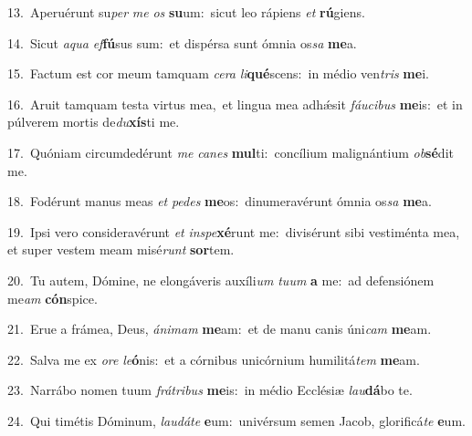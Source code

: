 {\numbfont\textcolor{\numbcolor}{13.}}~Aperuérunt su\textit{per} \textit{me} \textit{os} \textbf{su}\-um:~\star sicut leo rápiens \textit{et} \textbf{rú}\-giens.\par
{\numbfont\textcolor{\numbcolor}{14.}}~Sicut \textit{a}\-\textit{qua} \textit{ef}\-\textbf{fú}sus sum:~\star et dispérsa sunt ómnia os\textit{sa} \textbf{me}\-a.\par
{\numbfont\textcolor{\numbcolor}{15.}}~Factum est cor meum tamquam \textit{ce}\-\textit{ra} \textit{li}\-\textbf{qué}scens:~\star in médio ven\textit{tris} \textbf{me}\-i.\par
{\numbfont\textcolor{\numbcolor}{16.}}~Aruit tamquam testa virtus mea,~\dagger et lingua mea adhǽsit \textit{fáu}\-\textit{ci}\textit{bus} \textbf{me}\-is:~\star et in púlverem mortis de\-\textit{du}\-\textbf{xís}ti me.\par
{\numbfont\textcolor{\numbcolor}{17.}}~Quóniam circumdedérunt \textit{me} \textit{ca}\-\textit{nes} \textbf{mul}\-ti:~\star concílium malignántium \textit{ob}\-\textbf{sé}dit me.\par
{\numbfont\textcolor{\numbcolor}{18.}}~Fodérunt manus meas \textit{et} \textit{pe}\-\textit{des} \textbf{me}\-os:~\star dinumeravérunt ómnia os\textit{sa} \textbf{me}\-a.\par
{\numbfont\textcolor{\numbcolor}{19.}}~Ipsi vero consideravérunt \textit{et} \textit{in}\-\textit{spe}\textbf{xé}runt me:~\star divisérunt sibi vestiménta mea, et super vestem meam misé\textit{runt} \textbf{sor}\-tem.\par
{\numbfont\textcolor{\numbcolor}{20.}}~Tu autem, Dómine, ne elongáveris auxíli\textit{um} \textit{tu}\-\textit{um} \textbf{a} me:~\star ad defensiónem me\textit{am} \textbf{cón}\-spice.\par
{\numbfont\textcolor{\numbcolor}{21.}}~Erue a frámea, Deus, \textit{á}\-\textit{ni}\textit{mam} \textbf{me}\-am:~\star et de manu canis úni\textit{cam} \textbf{me}\-am.\par
{\numbfont\textcolor{\numbcolor}{22.}}~Salva me ex \textit{o}\-\textit{re} \textit{le}\-\textbf{ó}nis:~\star et a córnibus unicórnium humilitá\textit{tem} \textbf{me}\-am.\par
{\numbfont\textcolor{\numbcolor}{23.}}~Narrábo nomen tuum \textit{frá}\-\textit{tri}\textit{bus} \textbf{me}\-is:~\star in médio Ecclésiæ \textit{lau}\-\textbf{dá}bo te.\par
{\numbfont\textcolor{\numbcolor}{24.}}~Qui timétis Dóminum, \textit{lau}\-\textit{dá}\textit{te} \textbf{e}\-um:~\star univérsum semen Jacob, glorificá\textit{te} \textbf{e}\-um.\par

